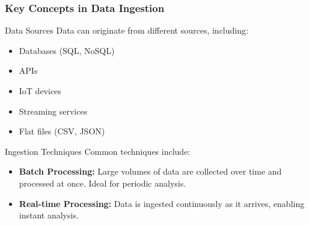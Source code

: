 \documentclass{beamer}
\begin{document}
\begin{frame}[fragile]
    \frametitle{Key Concepts in Data Ingestion}
    \begin{block}{Data Sources}
        Data can originate from different sources, including:
        \begin{itemize}
            \item Databases (SQL, NoSQL)
            \item APIs
            \item IoT devices
            \item Streaming services
            \item Flat files (CSV, JSON)
        \end{itemize}
    \end{block}
    
    \begin{block}{Ingestion Techniques}
        Common techniques include:
        \begin{itemize}
            \item \textbf{Batch Processing:} Large volumes of data are collected over time and processed at once. Ideal for periodic analysis.
            \item \textbf{Real-time Processing:} Data is ingested continuously as it arrives, enabling instant analysis.
        \end{itemize}
    \end{block}
\end{frame}
\end{document}
